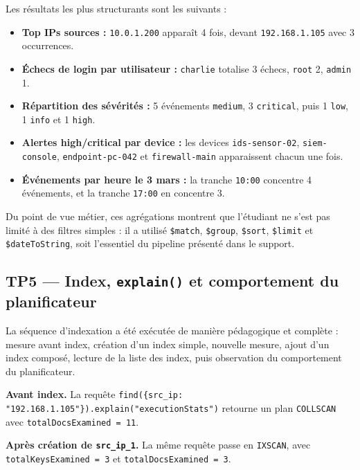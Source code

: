 \documentclass[11pt,a4paper]{article}
\begin{document}
Les résultats les plus structurants sont les suivants :

\begin{itemize}[leftmargin=1.2cm]
\item \textbf{Top IPs sources :} \texttt{10.0.1.200} apparaît 4 fois, devant \texttt{192.168.1.105} avec 3 occurrences.
\item \textbf{Échecs de login par utilisateur :} \texttt{charlie} totalise 3 échecs, \texttt{root} 2, \texttt{admin} 1.
\item \textbf{Répartition des sévérités :} 5 événements \texttt{medium}, 3 \texttt{critical}, puis 1 \texttt{low}, 1 \texttt{info} et 1 \texttt{high}.
\item \textbf{Alertes high/critical par device :} les devices \texttt{ids-sensor-02}, \texttt{siem-console}, \texttt{endpoint-pc-042} et \texttt{firewall-main} apparaissent chacun une fois.
\item \textbf{Événements par heure le 3 mars :} la tranche \texttt{10:00} concentre 4 événements, et la tranche \texttt{17:00} en concentre 3.
\end{itemize}

Du point de vue métier, ces agrégations montrent que l'étudiant ne s'est pas limité à des filtres simples : il a utilisé \texttt{\$match}, \texttt{\$group}, \texttt{\$sort}, \texttt{\$limit} et \texttt{\$dateToString}, soit l'essentiel du pipeline présenté dans le support.

\subsection{TP5 --- Index, \texttt{explain()} et comportement du planificateur}

La séquence d'indexation a été exécutée de manière pédagogique et complète : mesure avant index, création d'un index simple, nouvelle mesure, ajout d'un index composé, lecture de la liste des index, puis observation du comportement du planificateur.

\begin{evidencebox}
\textbf{Avant index.} La requête \texttt{find(\{src\_ip: "192.168.1.105"\}).explain("executionStats")} retourne un plan \texttt{COLLSCAN} avec \texttt{totalDocsExamined = 11}.
\end{evidencebox}

\begin{evidencebox}
\textbf{Après création de \texttt{src\_ip\_1}.} La même requête passe en \texttt{IXSCAN}, avec \texttt{totalKeysExamined = 3} et \texttt{totalDocsExamined = 3}.
\end{evidencebox}
\end{document}
